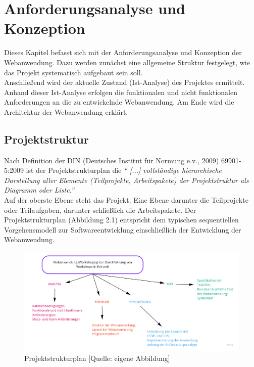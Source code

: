 \chapter{Anforderungsanalyse und Konzeption}
\label{sec:anforderungsanalyse}
Dieses Kapitel befasst sich mit der Anforderungsanalyse und Konzeption der Webanwendung. Dazu werden zunächst eine allgemeine Struktur festgelegt, wie das Projekt systematisch aufgebaut sein soll.
\\

Anschließend wird der aktuelle Zustand (Ist-Analyse) des Projektes ermittelt. Anhand dieser Ist-Analyse erfolgen die funktionalen und nicht funktionalen Anforderungen an die zu entwickelnde Webanwendung. Am Ende wird die Architektur der Webanwendung erklärt.


\section{Projektstruktur}
\label{sec:projektstruktur}
Nach Definition der DIN (Deutsches Institut für Normung e.v., 2009) 69901-5:2009 ist der Projektstrukturplan die \textit{“ [...] vollständige hierarchische Darstellung aller Elemente (Teilprojekte, Arbeitspakete) der Projektstruktur als Diagramm oder Liste.”}
\\

Auf der oberste Ebene steht das Projekt. Eine Ebene darunter die Teilprojekte oder Teilaufgaben, darunter schließlich die Arbeitspakete. 
Der Projektstrukturplan (Abbildung 2.1) entspricht dem typischen sequentiellen Vorgehensmodell zur Softwareentwicklung einschließlich der Entwicklung der Webanwendung.

\begin{figure}[H]
  \centering  
  \includegraphics[scale=0.3]{img/Projektstrukturplan.jpg}
  \caption{Projektstrukturplan [Quelle: eigene Abbildung]}
  \label{fig:projektstrukturplan}
\end{figure}

